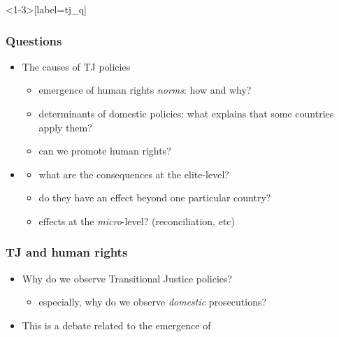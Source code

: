 \documentclass[aspectratio=43]{beamer}
\begin{document}
\begin{frame}<1-3>[label=tj_q]
\frametitle{Questions}
\centering

\begin{itemize}
  \item The causes of TJ policies
  \begin{itemize}
    \item<2-> emergence of human rights \textit{norms}: how and why?
    \item<3-> determinants of domestic policies: what explains that some countries apply them?
    \item<4-> can we promote human rights?
  \end{itemize}
  \item<5-> 
  \begin{itemize}
    \item<6-> what are the consequences at the elite-level?
    \item<7-> do they have an effect beyond one particular country?
    \item<8-> effects at the \textit{micro}-level? (reconciliation, etc)
  \end{itemize}

\end{itemize}

\end{frame}

\begin{frame}
\frametitle{TJ and human rights}
\centering

\begin{itemize}
  \item Why do we observe Transitional Justice policies?
  \begin{itemize}
    \item especially, why do we observe \textit{domestic} prosecutions?
  \end{itemize}
  \item This is a debate related to the emergence of 
\end{itemize}

\end{frame}
\end{document}
